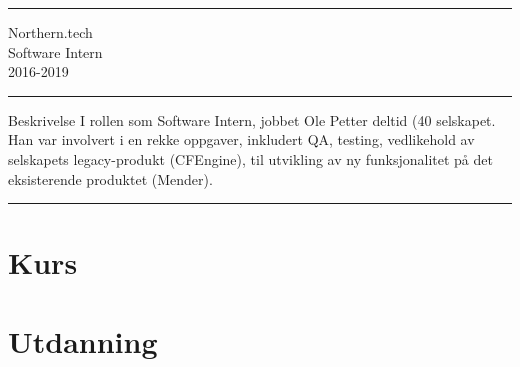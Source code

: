 \documentclass[11pt]{article}
\newenvironment*{experience}[3]{
  \par\noindent\rule{\textwidth}{0.4pt}
  #1 \\
  #2 \\
  #3 \\
  \par\noindent\rule{\textwidth}{0.4pt}
}
{\par\noindent\rule{\textwidth}{0.4pt}} %
\begin{document}
\begin{experience}{Northern.tech}{Software Intern}{2016-2019}
  Beskrivelse
  I rollen som Software Intern, jobbet Ole Petter deltid (40%
  selskapet. Han var involvert i en rekke oppgaver, inkludert QA, testing, vedlikehold av selskapets legacy-produkt
  (CFEngine), til utvikling av ny funksjonalitet på det eksisterende produktet (Mender).
\end{experience}

\section{Kurs}

\section{Utdanning}
\end{document}

